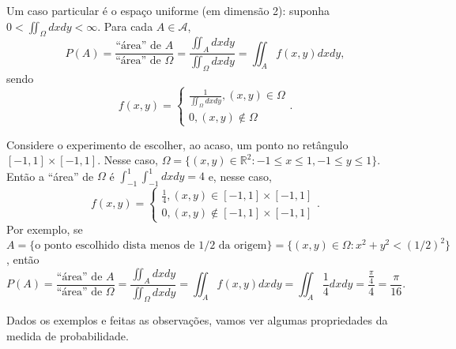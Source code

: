 \documentclass[../Notas.tex]{subfiles}
\begin{document}
\begin{itemize}
    Um caso particular é o espaço uniforme (em dimensão 2): suponha $\displaystyle{ 0 < \iint_{\Omega} dxdy < \infty }$. Para cada $A\in\mathcal{A}$, 
    $$
    P(A) = \frac{ \text{``área'' de $A$} }{ \text{``área'' de $\Omega$} } = \frac{ \iint_{A}dxdy }{ \iint_{\Omega}dxdy } = \iint_A f(x,y) dxdy,
    $$
    sendo
    $$
    f(x,y) = \begin{cases}
    \displaystyle{ \frac{1}{\iint_{\Omega}dxdy }, (x,y)\in\Omega } \\
    0, (x,y)\notin\Omega
    \end{cases}.
    $$
    \begin{example}
    Considere o experimento de escolher, ao acaso, um ponto no retângulo $[-1,1]\times [-1,1]$. Nesse caso, $\Omega = \{ (x,y)\in\mathbb{R}^2 : -1\leq x\leq 1, -1\leq y\leq 1 \}$. Então a ``área'' de $\Omega$ é $\displaystyle{ \int_{-1}^{1}\int_{-1}^1 dxdy } = 4$ e, nesse caso,
    $$
    f(x,y) = \begin{cases}
    \displaystyle{ \frac{1}{4}, (x,y)\in [-1,1]\times [-1,1] } \\
    0, (x,y)\notin [-1,1]\times [-1,1]
    \end{cases}.
    $$
    Por exemplo, se $A = \{ \text{o ponto escolhido dista menos de 1/2 da origem} \} = \{ (x,y)\in\Omega : x^2 + y^2 < (1/2)^2 \}$, então
    $$
    P(A) = \frac{ \text{``área'' de $A$} }{ \text{``área'' de $\Omega$} } = \frac{ \iint_{A}dxdy }{ \iint_{\Omega}dxdy } = \iint_A f(x,y) dxdy = \iint_A \frac{1}{4}dxdy = \frac{\frac{\pi}{4}}{4} = \frac{\pi}{16}.
    $$
    \end{example}
\end{itemize}

Dados os exemplos e feitas as observações, vamos ver algumas propriedades da medida de probabilidade.
\end{document}
